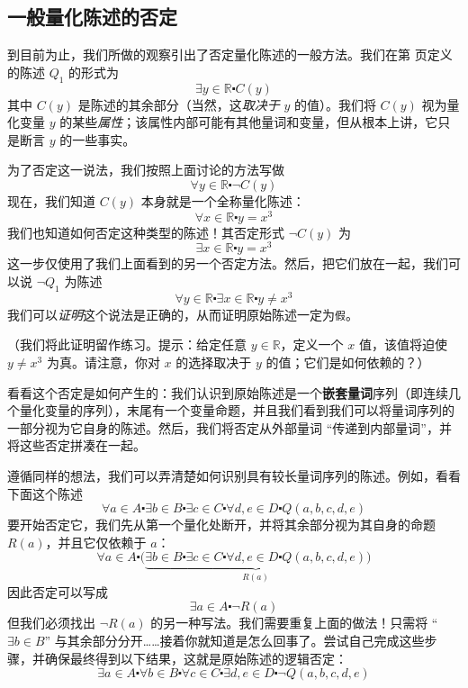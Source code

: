 \subsection{一般量化陈述的否定}

到目前为止，我们所做的观察引出了否定量化陈述的一般方法。我们在第 \pageref{sec:section4.4} 页定义的陈述 $Q_1$ 的形式为
\[\exists y \in \mathbb{R} \centerdot C(y)\]
其中 $C(y)$ 是陈述的其余部分（当然，这\emph{取决于} $y$ 的值）。我们将 $C(y)$ 视为量化变量 $y$ 的某些\emph{属性}；该属性内部可能有其他量词和变量，但从根本上讲，它只是断言 $y$ 的一些事实。

为了否定这一说法，我们按照上面讨论的方法写做
\[\forall y \in \mathbb{R} \centerdot \neg C(y)\]
现在，我们知道 $C(y)$ 本身就是一个全称量化陈述：
\[\forall x \in \mathbb{R} \centerdot y = x^3\]
我们也知道如何否定这种类型的陈述！其否定形式 $\neg C(y)$ 为
\[\exists x \in \mathbb{R} \centerdot y = x^3\]
这一步仅使用了我们上面看到的另一个否定方法。然后，把它们放在一起，我们可以说 $\neg Q_1$ 为陈述
\[\forall y \in \mathbb{R} \centerdot \exists x \in \mathbb{R} \centerdot y \ne x^3\]
我们可以\emph{证明}这个说法是正确的，从而证明原始陈述一定为\verb|假|。

（我们将此证明留作练习。提示：给定任意 $y \in \mathbb{R}$，定义一个 $x$ 值，该值将迫使 $y \ne x^3$ 为真。请注意，你对 $x$ 的选择取决于 $y$ 的值；它们是如何依赖的？）

看看这个否定是如何产生的：我们认识到原始陈述是一个\textbf{嵌套量词}序列（即连续几个量化变量的序列），末尾有一个变量命题，并且我们看到我们可以将量词序列的一部分视为它自身的陈述。然后，我们将否定从外部量词 ``传递到内部量词''，并将这些否定拼凑在一起。

遵循同样的想法，我们可以弄清楚如何识别具有较长量词序列的陈述。例如，看看下面这个陈述
\[\forall a \in A \centerdot \exists b \in B \centerdot \exists c \in C \centerdot \forall d, e \in D \centerdot Q(a, b, c, d, e)\]
要开始否定它，我们先从第一个量化处断开，并将其余部分视为其自身的命题 $R(a)$，并且它仅依赖于 $a$：
\[\forall a \in A \centerdot \big(\underbrace{\exists b \in B \centerdot \exists c \in C \centerdot \forall d, e \in D \centerdot Q(a, b, c, d, e)}_{R(a)}\big)\]
因此否定可以写成
\[\exists a \in A \centerdot \neg R(a)\]
但我们必须找出 $\neg R(a)$ 的另一种写法。我们需要重复上面的做法！只需将 ``$\exists b \in B$'' 与其余部分分开……接着你就知道是怎么回事了。尝试自己完成这些步骤，并确保最终得到以下结果，这就是原始陈述的逻辑否定：
\[\exists a \in A \centerdot \forall b \in B \centerdot \forall c \in C \centerdot \exists d, e \in D \centerdot \neg Q(a, b, c, d, e)\]

